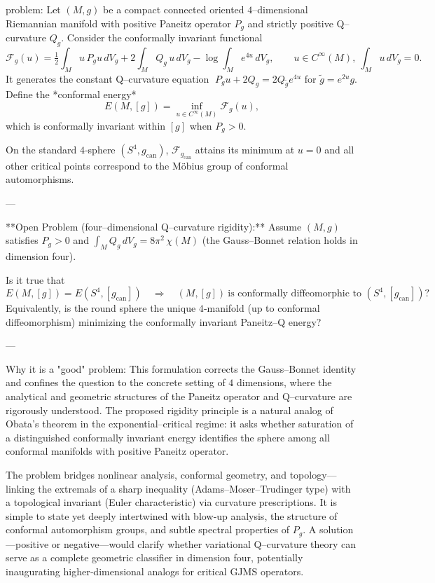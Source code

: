 problem:  
Let $(M,g)$ be a compact connected oriented $4$–dimensional Riemannian manifold with positive Paneitz operator $P_g$ and strictly positive Q–curvature $Q_g$.  Consider the conformally invariant functional
\[
\mathcal{F}_g(u)
=\tfrac12\int_M u\,P_g u\,dV_g
 + 2\int_M Q_g\,u\,dV_g
 - \log\!\int_M e^{4u}\,dV_g , \qquad
u\in C^\infty(M),\ \int_M u\,dV_g=0 .
\]
It generates the constant Q–curvature equation
$\;P_g u + 2Q_g = 2Q_{\tilde g}e^{4u}$ for $\tilde g=e^{2u}g.$
Define the *conformal energy*
\[
E(M,[g])=\inf_{u\in C^\infty(M)}\mathcal{F}_g(u),
\]
which is conformally invariant within $[g]$ when $P_g>0$.

On the standard $4$‑sphere $(S^4,g_{\mathrm{can}})$,
$\mathcal{F}_{g_{\mathrm{can}}}$ attains its minimum at $u=0$ and all other critical points correspond to the Möbius group of conformal automorphisms.

---

**Open Problem (four–dimensional Q–curvature rigidity):**  
Assume $(M,g)$ satisfies $P_g>0$ and $\int_M Q_g\,dV_g=8\pi^2\,\chi(M)$ (the Gauss–Bonnet relation holds in dimension four).  

Is it true that
\[
E(M,[g])=E(S^4,[g_{\mathrm{can}}])
\quad\Longrightarrow\quad
(M,[g])\ \text{is conformally diffeomorphic to } (S^4,[g_{\mathrm{can}}])?
\]
Equivalently, is the round sphere the unique $4$‑manifold (up to conformal diffeomorphism) minimizing the conformally invariant Paneitz–Q energy?

---

Why it is a "good" problem:  
This formulation corrects the Gauss–Bonnet identity and confines the question to the concrete setting of $4$ dimensions, where the analytical and geometric structures of the Paneitz operator and Q–curvature are rigorously understood.  The proposed rigidity principle is a natural analog of Obata’s theorem in the exponential–critical regime: it asks whether saturation of a distinguished conformally invariant energy identifies the sphere among all conformal manifolds with positive Paneitz operator.  

The problem bridges nonlinear analysis, conformal geometry, and topology—linking the extremals of a sharp inequality (Adams–Moser–Trudinger type) with a topological invariant (Euler characteristic) via curvature prescriptions.  It is simple to state yet deeply intertwined with blow‑up analysis, the structure of conformal automorphism groups, and subtle spectral properties of $P_g$.  A solution—positive or negative—would clarify whether variational Q–curvature theory can serve as a complete geometric classifier in dimension four, potentially inaugurating higher‑dimensional analogs for critical GJMS operators.